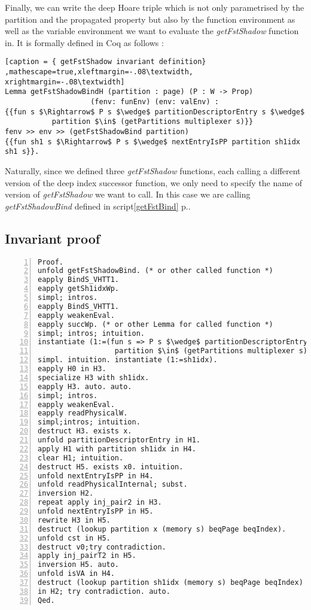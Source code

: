 Finally, we can write the deep Hoare triple which is not only parametrised by the partition and the propagated property but also by the function environment as well as the variable environment we want to evaluate the \textit{getFstShadow} function in. It is formally defined in Coq as follows : 
\begin{lstlisting}[caption = { getFstShadow invariant definition} ,mathescape=true,xleftmargin=-.08\textwidth,
xrightmargin=-.08\textwidth]
Lemma getFstShadowBindH (partition : page) (P : W -> Prop) 
	                (fenv: funEnv) (env: valEnv) :
{{fun s $\Rightarrow$ P s $\wedge$ partitionDescriptorEntry s $\wedge$ 
           partition $\in$ (getPartitions multiplexer s)}}
fenv >> env >> (getFstShadowBind partition) 
{{fun sh1 s $\Rightarrow$ P s $\wedge$ nextEntryIsPP partition sh1idx sh1 s}}.
\end{lstlisting} \vspace{4pt}
Naturally, since we defined three \textit{getFstShadow} functions, each calling a different version of the deep index successor function, we only need to specify the name of version of \textit{getFstShadow} we want to  call. In this case we are calling \textit{getFstShadowBind} defined in script\ref{getFstBind} p.\pageref{getFstBind}.


\subsection{Invariant proof}
\begin{lstlisting}[caption = {proof of the getFstShadow invariant},xleftmargin=-.08\textwidth,
xrightmargin=-.08\textwidth,mathescape=true,numbers=left]
Proof.
unfold getFstShadowBind. (* or other called function *)
eapply BindS_VHTT1.
eapply getSh1idxWp.
simpl; intros.
eapply BindS_VHTT1.
eapply weakenEval.
eapply succWp. (* or other Lemma for called function *)
simpl; intros; intuition.
instantiate (1:=(fun s => P s $\wedge$ partitionDescriptorEntry s $\wedge$ 
                  partition $\in$ (getPartitions multiplexer s))).
simpl. intuition. instantiate (1:=sh1idx).
eapply H0 in H3.
specialize H3 with sh1idx.
eapply H3. auto. auto.
simpl; intros.
eapply weakenEval.
eapply readPhysicalW.
simpl;intros; intuition.
destruct H3. exists x.
unfold partitionDescriptorEntry in H1.
apply H1 with partition sh1idx in H4.
clear H1; intuition.
destruct H5. exists x0. intuition.
unfold nextEntryIsPP in H4.
unfold readPhysicalInternal; subst.
inversion H2.
repeat apply inj_pair2 in H3.
unfold nextEntryIsPP in H5.
rewrite H3 in H5.
destruct (lookup partition x (memory s) beqPage beqIndex).
unfold cst in H5.
destruct v0;try contradiction.
apply inj_pairT2 in H5.
inversion H5. auto.
unfold isVA in H4.
destruct (lookup partition sh1idx (memory s) beqPage beqIndex) 
in H2; try contradiction. auto.
Qed.
\end{lstlisting} 

